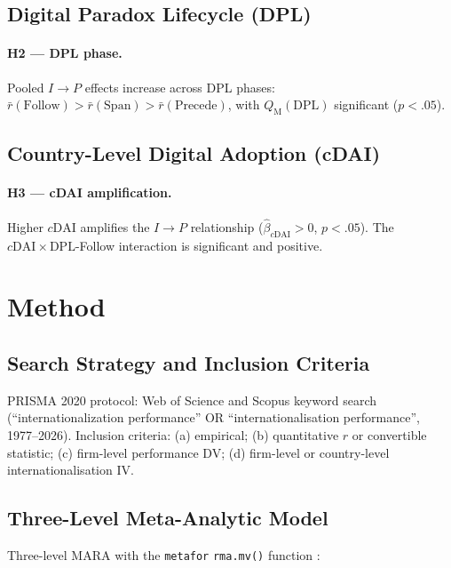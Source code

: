 \documentclass[review,authoryear]{elsarticle}
\newcommand{\rbar}{\bar{r}}                 %
\newcommand{\cDAI}{c\mathrm{DAI}}           %
\newcommand{\DPL}{\mathrm{DPL}}
\newcommand{\QM}{Q_{\mathrm{M}}}
\begin{document}
\subsection{Digital Paradox Lifecycle (DPL)}

\paragraph{H2 --- DPL phase.}
Pooled \(I \to P\) effects increase across DPL phases:
\(\rbar(\text{Follow}) > \rbar(\text{Span}) > \rbar(\text{Precede})\),
with \(\QM(\DPL)\) significant (\(p < .05\)).

\subsection{Country-Level Digital Adoption (cDAI)}

\paragraph{H3 --- cDAI amplification.}
Higher \(\cDAI\) amplifies the \(I \to P\) relationship
(\(\hat{\beta}_{\cDAI} > 0\), \(p < .05\)).  The \(\cDAI \times \DPL\)-Follow
interaction is significant and positive.

\section{Method}
\label{sec:method}

\subsection{Search Strategy and Inclusion Criteria}

PRISMA 2020 protocol: Web of Science and Scopus keyword search
(``internationalization performance'' OR ``internationalisation performance'',
1977--2026).  Inclusion criteria: (a) empirical; (b) quantitative \(r\) or
convertible statistic; (c) firm-level performance DV; (d) firm-level or
country-level internationalisation IV.

\subsection{Three-Level Meta-Analytic Model}

Three-level MARA with the \texttt{metafor} \texttt{rma.mv()} function
\parencite{Viechtbauer2010}:
\end{document}
